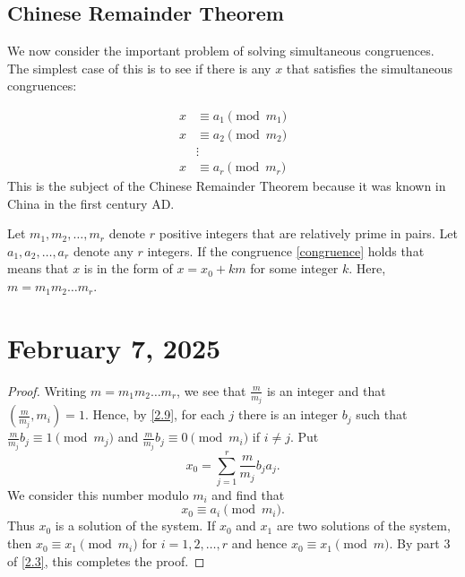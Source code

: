\documentclass[11pt]{article}
\begin{document}
\subsection{Chinese Remainder Theorem}\label{Section 2.3}
We now consider the important problem of solving simultaneous congruences. The
simplest case of this is to see if there is any \(x\) that satisfies the
simultaneous congruences:

\[
	\begin{aligned}\label{congruence}
		x & \equiv a_1 \pmod{m_1} \\
		x & \equiv a_2 \pmod{m_2} \\
		  & \vdots                \\
		x & \equiv a_r \pmod{m_r}
	\end{aligned}
\]
This is the subject of the Chinese Remainder Theorem because it was known in
China in the first century AD.

\begin{theorem}\label{2.18}
	Let \(m_1, m_2, \ldots, m_r\) denote \(r\) positive integers that are relatively prime in pairs. Let \(a_1, a_2, \ldots, a_r\) denote any \(r\) integers. If the congruence \ref{congruence} holds that means that \(x\) is in the form of \(x = x_0 + km\) for some integer \(k\). Here, \(m = m_1 m_2 \ldots m_r\).
\end{theorem}

\section{February 7, 2025}
\begin{proof}
	Writing \(m = m_1 m_2 \ldots m_r\), we see that \(\frac{m}{m_j}\) is an integer and that \(\left(\frac{m}{m_j}, m_i\right) = 1\). Hence, by \cref{2.9}, for each \(j\) there is an integer \(b_j\) such that \(\frac{m}{m_j} b_j \equiv 1 \pmod{m_j}\) and \(\frac{m}{m_j} b_j \equiv 0 \pmod{m_i}\) if \(i \neq j\). Put
	\[x_0 = \sum_{j=1}^{r} \frac{m}{m_j} b_j a_j.\]
	We consider this number modulo \(m_i\) and find that
	\[x_0 \equiv a_i \pmod{m_i}.\]
	Thus \(x_0\) is a solution of the system. If \(x_0\) and \(x_1\) are two
	solutions of the system, then \(x_0 \equiv x_1 \pmod{m_i}\) for \(i = 1, 2,
	\ldots, r\) and hence \(x_0 \equiv x_1 \pmod{m}\). By part 3 of \cref{2.3},
	this completes the proof.
\end{proof}
\end{document}
